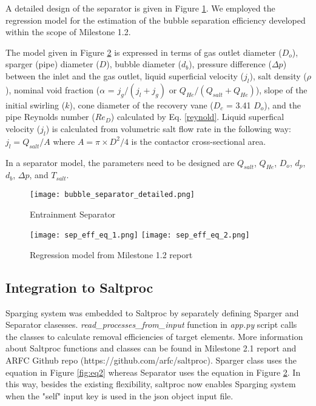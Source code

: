 \begin{itemize}
    A detailed design of the separator is given in Figure 
    \ref{fig:bubble_sprt}. We employed the regression model for the estimation 
    of the bubble separation efficiency developed within the scope of Milestone 
    1.2.

    The model given in Figure \ref{fig:reg_model} is expressed in terms of gas 
    outlet diameter ($D_o$), sparger (pipe) diameter ($D$), bubble diameter 
    ($d_b$), pressure difference ($\Delta p$) between the inlet and the gas 
    outlet, liquid superficial velocity ($j_l$), salt density ($\rho$), nominal 
    void fraction ($\alpha$ = $j_g/(j_{l}+j_{g})$ or 
    $Q_{He}/(Q_{salt}+Q_{He})$), slope of the initial swirling ($k$), cone 
    diameter of the recovery vane ($D_c$ = 3.41 $D_o$), and the pipe Reynolds 
    number ($Re_D$) calculated by Eq. \ref{reynold}. Liquid superfical velocity 
    ($j_l$) is calculated from volumetric salt flow rate in the following way: 
    $j_l = Q_{salt}/A$ where $A = \pi\times D^2/4$ is the contactor 
    cross-sectional area.

    In a separator model, the parameters need to be designed are $Q_{salt}$, 
    $Q_{He}$, $D_o$, $d_p$, $d_b$, $\Delta p$, and $T_{salt}$.

    \begin{figure}[htbp!]
        \begin{center}
            \texttt{[image: bubble\_separator\_detailed.png]}
        \end{center}
        \caption{Entrainment Separator}
        \label{fig:bubble_sprt}
    \end{figure}

    \begin{figure}[htbp!]
        \begin{center}
            \texttt{[image: sep\_eff\_eq\_1.png]}
            \texttt{[image: sep\_eff\_eq\_2.png]}
        \end{center}
        \caption{Regression model from Milestone 1.2 report}
        \label{fig:reg_model}
    \end{figure}

\FloatBarrier

\subsection{Integration to Saltproc}

    Sparging system was embedded to Saltproc by separately defining Sparger and 
    Separator clasesses. \textit{read\_processes\_from\_input} function in 
    \textit{app.py} script calls the classes to calculate removal efficiencies 
    of target elements. More information about Saltproc functions and classes 
    can be found in Milestone 2.1 report \cite{rykhlevskii_milestone_2019} and 
    ARFC Github repo (https://github.com/arfc/saltproc). Sparger class uses the 
    equation in Figure \ref{fig:eq2} whereas Separator uses the equation in 
    Figure \ref{fig:reg_model}. In this way, besides the existing flexibility, 
    saltproc now enables Sparging system when the "self" input key is used in 
    the json object input file.


\end{itemize}
